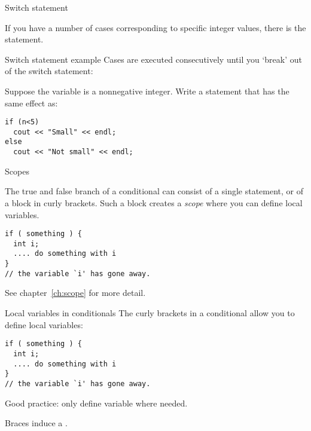  {Switch statement}

If you have a number of cases corresponding to specific integer
values, there is the  statement.

\begin{block}{Switch statement example}
  \label{sl:switch}
  Cases are executed consecutively until you `break' out of the switch
  statement:
\end{block}

\begin{exercise}
  \label{ex:switch-range}
  Suppose the variable  is a nonnegative integer. Write a
   statement that has the same effect as:
\begin{lstlisting}
if (n<5)
  cout << "Small" << endl;
else
  cout << "Not small" << endl;
\end{lstlisting}

\end{exercise}
 {Scopes}

The true and false branch of a conditional can consist of a single
statement, or of a block in curly brackets. Such a block creates a
%
\emph{scope}
%
where you can define local variables.

\begin{lstlisting}
if ( something ) {
  int i; 
  .... do something with i
}
// the variable `i' has gone away.
\end{lstlisting}

See chapter~\ref{ch:scope} for more detail.

\begin{slide}{Local variables in conditionals}
  \label{sl:if-scope}
  The curly brackets in a conditional allow you to define local variables:
\begin{lstlisting}
if ( something ) {
  int i; 
  .... do something with i
}
// the variable `i' has gone away.
\end{lstlisting}
Good practice: only define variable where needed.

Braces induce a .
\end{slide}

